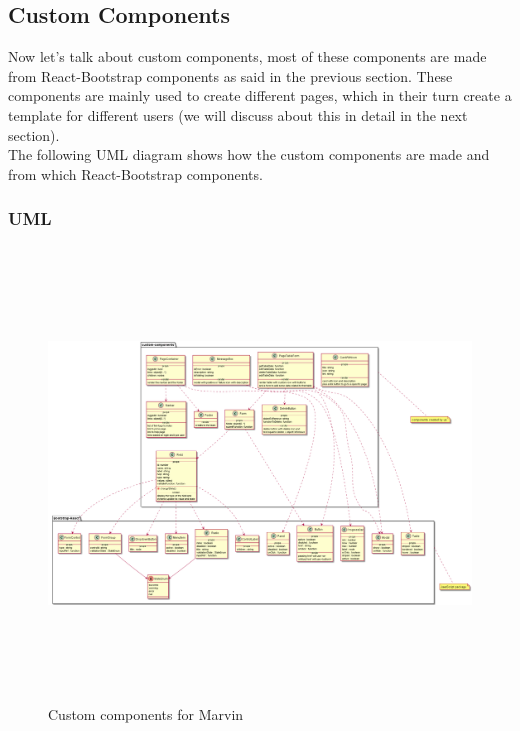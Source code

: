 	\subsection{Custom Components} Now let's talk about custom components, most of these components are made from React-Bootstrap components as said in the previous section. These components are mainly used to create different pages, which in their turn create a template for different users (we will discuss about this in detail in the next section). \\The following UML diagram shows how the custom components are made and from which React-Bootstrap components.  
	\\ 
		\subsubsection{UML}
			\begin{figure}[h]
			\centering
			\includegraphics[width=15.5cm,height=12cm]{"diagrammi/react/customComponents"}
			\caption{Custom components for Marvin}
			\label{fig:Custom components for Marvin}
		\end{figure}